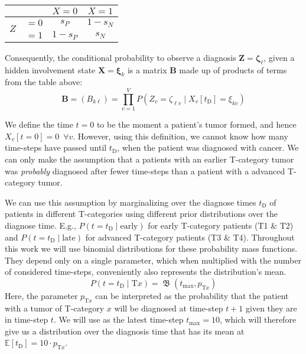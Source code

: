 \documentclass[twocolumn]{article}
\begin{document}
\begin{table}[!h]
\centering
\begin{tabular}{|cc|cc|}
    \hline
    & & $X=0$ & $X=1$ \\
    \hline
    \multirow{2}{*}{$Z$} & $=0$ & $s_P$ & $1-s_N$ \\
    & $=1$ & $1-s_P$ & $s_N$ \\
    \hline
\end{tabular}
\end{table}

Consequently, the conditional probability to observe a diagnosis $\mathbf{Z}=\boldsymbol{\zeta}_\ell$, given a hidden involvement state $\mathbf{X}=\boldsymbol{\xi}_k$ is a matrix $\mathbf{B}$ made up of products of terms from the table above:
%
\begin{equation} \label{eq:transition_matrix}
    \mathbf{B} = \left( B_{k\ell} \right) = \prod_{v=1}^V P\left( Z_v = \zeta_{\ell v} \mid X_v[t_\text{D}] = \xi_{kv} \right)
\end{equation}

We define the time $t=0$ to be the moment a patient's tumor formed, and hence $X_v[t=0]=0 \,\,\, \forall v$. However, using this definition, we cannot know how many time-steps have passed until $t_\text{D}$, when the patient was diagnosed with cancer. We can only make the assumption that a patients with an earlier T-category tumor was \emph{probably} diagnosed after fewer time-steps than a patient with a advanced T-category tumor.

We can use this assumption by marginalizing over the diagnose times $t_\text{D}$ of patients in different T-categories using different prior distributions over the diagnose time. E.g., $P \left( t=t_\text{D} \mid \text{early} \right)$ for early T-category patients (T1 \& T2) and $P \left( t=t_\text{D} \mid \text{late} \right)$ for advanced T-category patients (T3 \& T4). Throughout this work we will use binomial distributions for these probability mass functions. They depend only on a single parameter, which when multiplied with the number of considered time-steps, conveniently also represents the distribution's mean.
%
\begin{equation} \label{eq:time_dist}
    P \left( t = t_\text{D} \mid \text{T}x \right) = \operatorname{\mathfrak{B}}(t_\text{max},p_{\text{T}x})
\end{equation}
%
Here, the parameter $p_{\text{T}x}$ can be interpreted as the probability that the patient with a tumor of T-category $x$ will be diagnosed at time-step $t+1$ given they are in time-step $t$. We will use as the latest time-step $t_\text{max} = 10$, which will therefore give us a distribution over the diagnosis time that has its mean at $\mathbb{E}[t_\text{D}] = 10 \cdot p_{\text{T}x}$.
\end{document}
